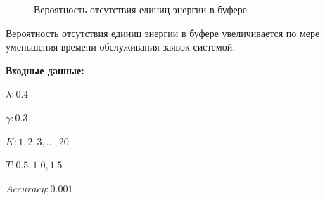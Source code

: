 \documentclass[12pt, a4paper]{article}
\begin{document}
\begin{figure}[h]
	\caption{Вероятность отсутствия единиц энергии в буфере}
	\label{ris5}
\end{figure}

Вероятность отсутствия единиц энергии в буфере увеличивается по мере уменьшения времени обслуживания заявок системой. 

\pagebreak
\textbf{Входные данные:}

$\lambda: 0.4$

$\gamma: 0.3$

$K: 1, 2, 3, \ldots, 20$

$T: 0.5, 1.0, 1.5$

$Accuracy: 0.001$
\end{document}
